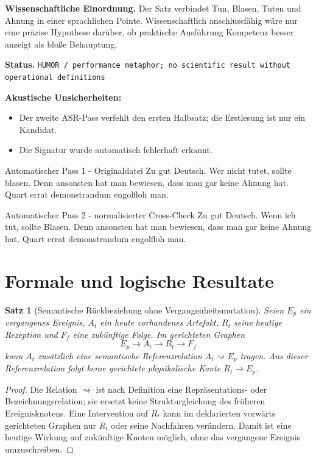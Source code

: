 \documentclass[11pt,a4paper]{article}
\newtheorem{satz}{Satz}
\newcommand{\status}[1]{\texttt{#1}}
\begin{document}
\textbf{Wissenschaftliche Einordnung.} Der Satz verbindet Tun, Blasen, Tuten und Ahnung in einer sprachlichen Pointe. Wissenschaftlich anschlussfähig wäre nur eine präzise Hypothese darüber, ob praktische Ausführung Kompetenz besser anzeigt als bloße Behauptung.

\textbf{Status.} \status{HUMOR / performance metaphor; no scientific result without operational definitions}

\textbf{Akustische Unsicherheiten:}
\begin{itemize}
\item Der zweite ASR-Pass verfehlt den ersten Halbsatz; die Erstlesung ist nur ein Kandidat.
\item Die Signatur wurde automatisch fehlerhaft erkannt.
\end{itemize}

\begin{asrbox}{Automatischer Pass 1 - Originaldatei}
Zu gut Deutsch. Wer nicht tutet, sollte blasen. Denn ansonsten hat man bewiesen, dass man gar keine Ahnung hat. Quart errat demonstrandum engolfloh man.
\end{asrbox}

\begin{asrbox}{Automatischer Pass 2 - normalisierter Cross-Check}
Zu gut Deutsch. Wenn ich tut, sollte Blasen. Denn ansonsten hat man bewiesen, dass man gar keine Ahnung hat. Quart errat demonstrandum engolfloh man.
\end{asrbox}

\section{Formale und logische Resultate}

\begin{satz}[Semantische Rückbeziehung ohne Vergangenheitsmutation]
Seien $E_p$ ein vergangenes Ereignis, $A_t$ ein heute vorhandenes Artefakt, $R_t$ seine heutige Rezeption und $F_f$ eine zukünftige Folge. Im gerichteten Graphen
\[
E_p \longrightarrow A_t \longrightarrow R_t \longrightarrow F_f
\]
kann $A_t$ zusätzlich eine semantische Referenzrelation $A_t \rightsquigarrow E_p$ tragen. Aus dieser Referenzrelation folgt keine gerichtete physikalische Kante $R_t \to E_p$.
\end{satz}
\begin{proof}
Die Relation $\rightsquigarrow$ ist nach Definition eine Repräsentations- oder Bezeichnungsrelation; sie ersetzt keine Strukturgleichung des früheren Ereignisknotens. Eine Intervention auf $R_t$ kann im deklarierten vorwärts gerichteten Graphen nur $R_t$ oder seine Nachfahren verändern. Damit ist eine heutige Wirkung auf zukünftige Knoten möglich, ohne das vergangene Ereignis umzuschreiben.
\end{proof}
\end{document}
